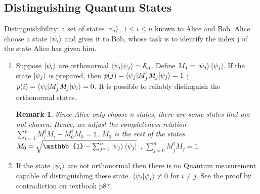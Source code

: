 \documentclass[]{book}
\newtheorem*{remark}{Remark}
\theoremstyle{nonumberplain}
\begin{document}
\subsection{Distinguishing Quantum States}
Distinguishibility: a set of states $\ket{\psi_{i}}$, $1 \leq i \leq n$ known to Alice and Bob. Alice choose a state $\ket{\psi_{i}}$ and gives it to Bob, whose task is to identify the index j of the state Alice has given him.
\begin{enumerate}
	\item Suppose $\ket{\psi_{i}}$ are orthonormal $\braket{\psi_{i}|\psi_{j}}=\delta_{ij}$. Define $M_{j}=\ket{\psi_{j}}\bra{\psi_{j}}$. If the state $\ket{\psi_{j}}$ is prepared, then $p(j)=\braket{\psi_{j}|M_{j}^{\dagger}M_{j}|\psi_{j}}=1$ ; $p(i)=\braket{\psi_{i}|M_{j}^{\dagger}M_{j}|\psi_{i}}=0$. It is possible to reliably distinguish the orthonormal states. 
\begin{remark}
	Since Alice only choose n states, there are some states that are not chosen. Hence, we adjust the completeness relation $ \sum^{n}_{i=1} M_{i}^{\dagger}M_{i} + M_{0}^{\dagger}M_{0}=\mathbb{1}$. $M_{0}$ is the rest of the states. $M_{0}=\sqrt{\mathbb{1}-\sum^{n}_{j=1}\ket{\psi_{j}}\bra{\psi_{j}}}$ , $\sum^{n}_{j=0}M^{\dagger}_{j}M_{j}=\mathbb{1}$
\end{remark}
	\item If the state $\ket{\psi_{i}}$ are not orthonormal then there is no Quantum measurement capable of distinguishing these state. $\braket{\psi_{i}|\psi_{j}}\neq 0$ for $i\neq j$. See the proof by contradiction on textbook p87.
\end{enumerate}
\end{document}
